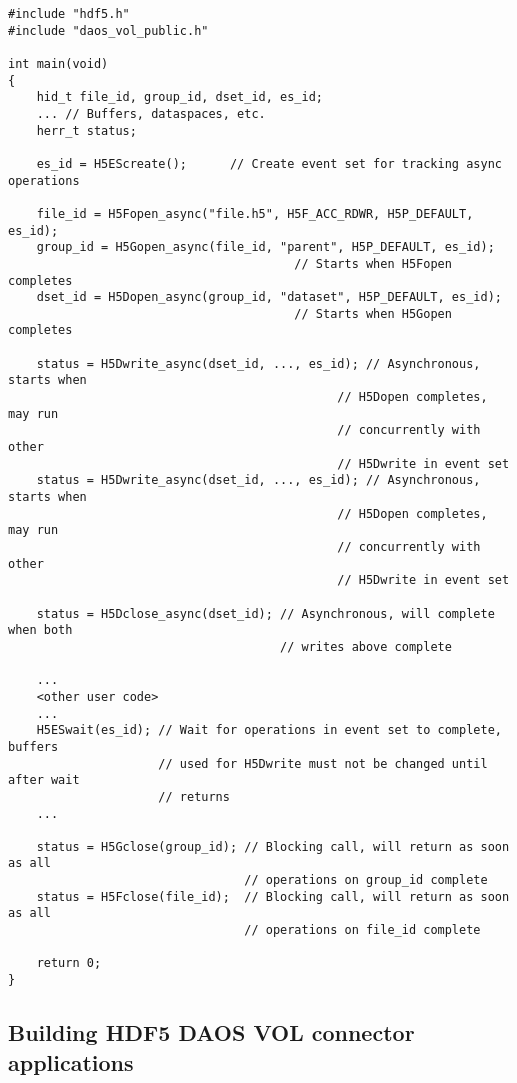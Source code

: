 \documentclass[../users_guide.tex]{subfiles}
\begin{document}
\begin{verbatim}
#include "hdf5.h"
#include "daos_vol_public.h"

int main(void)
{
    hid_t file_id, group_id, dset_id, es_id;
    ... // Buffers, dataspaces, etc.
    herr_t status;

    es_id = H5EScreate();      // Create event set for tracking async operations

    file_id = H5Fopen_async("file.h5", H5F_ACC_RDWR, H5P_DEFAULT, es_id);
    group_id = H5Gopen_async(file_id, "parent", H5P_DEFAULT, es_id);
                                        // Starts when H5Fopen completes
    dset_id = H5Dopen_async(group_id, "dataset", H5P_DEFAULT, es_id);
                                        // Starts when H5Gopen completes

    status = H5Dwrite_async(dset_id, ..., es_id); // Asynchronous, starts when
                                              // H5Dopen completes, may run
                                              // concurrently with other
                                              // H5Dwrite in event set
    status = H5Dwrite_async(dset_id, ..., es_id); // Asynchronous, starts when
                                              // H5Dopen completes, may run
                                              // concurrently with other
                                              // H5Dwrite in event set

    status = H5Dclose_async(dset_id); // Asynchronous, will complete when both
                                      // writes above complete

    ...
    <other user code>
    ...
    H5ESwait(es_id); // Wait for operations in event set to complete, buffers
                     // used for H5Dwrite must not be changed until after wait
                     // returns
    ...

    status = H5Gclose(group_id); // Blocking call, will return as soon as all
                                 // operations on group_id complete
    status = H5Fclose(file_id);  // Blocking call, will return as soon as all
                                 // operations on file_id complete

    return 0;
}
\end{verbatim}

\subsection{Building HDF5 DAOS VOL connector applications}
\end{document}
